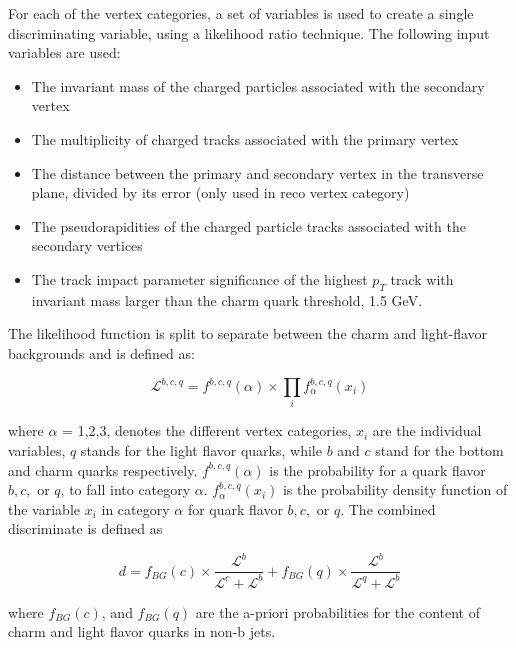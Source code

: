 \par For each of the vertex categories, a set of variables is used to
create a single discriminating variable, using a likelihood ratio
technique.  The following input variables are used:
\begin{itemize}
  \item The invariant mass of the charged particles associated with
    the secondary vertex
  \item The multiplicity of charged tracks associated with the primary
    vertex
  \item The distance between the primary and secondary vertex in the
    transverse plane, divided by its error (only used in reco vertex category)
  \item The pseudorapidities of the charged particle tracks associated
    with the secondary vertices
  \item The track impact parameter significance of the highest $p_{T}$
    track with invariant mass larger than the charm quark threshold,
    1.5 GeV. 
\end{itemize}

\noindent The likelihood function is split to separate between the
charm and light-flavor backgrounds and is defined as:

\begin{equation}\label{eq:csv_likelihood}
\mathcal{L}^{b,c,q} =
f^{b,c,q}(\alpha)\times\prod_{i}f_{\alpha}^{b,c,q}(x_{i})
\end{equation}

\noindent where $\alpha$ = 1,2,3, denotes the different vertex
categories, $x_{i}$ are the individual variables, $q$ stands for the
light flavor quarks, while $b$ and $c$ stand for the bottom and charm
quarks respectively.  $f^{b,c,q}(\alpha)$ is the probability for a
quark flavor $b,c,$ or $q$, to fall into category $\alpha$.
$f_{\alpha}^{b,c,q}(x_{i})$ is the probability density
function of the variable $x_{i}$ in category $\alpha$ for quark flavor
$b,c,$ or $q$.  The combined discriminate is defined as

\begin{equation}\label{eq:csv_disc}
d = f_{BG}(c)\times\frac{\mathcal{L}^{b}}{\mathcal{L}^{c} +
  \mathcal{L}^{b}} + f_{BG}(q)\times\frac{\mathcal{L}^{b}}{\mathcal{L}^{q} +
  \mathcal{L}^{b}}
\end{equation}

\noindent where $f_{BG}(c)$, and $f_{BG}(q)$ are
the a-priori probabilities for the content of charm and light flavor
quarks in non-b jets.  

